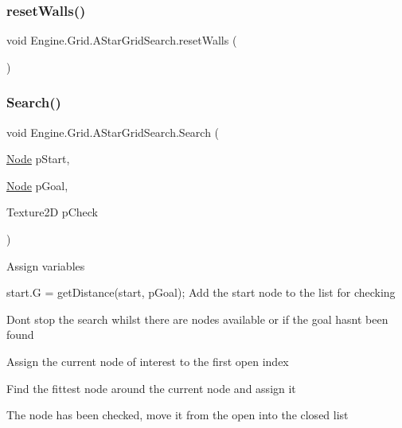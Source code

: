 \mbox{\label{a00398_a0e6a0e9cbcdaccff905216da631fad56}} 
\subsubsection{\texorpdfstring{reset\+Walls()}{resetWalls()}}
{\footnotesize\ttfamily void Engine.\+Grid.\+A\+Star\+Grid\+Search.\+reset\+Walls (\begin{DoxyParamCaption}{ }\end{DoxyParamCaption})\hspace{0.3cm}{\ttfamily [inline]}}

\mbox{\label{a00398_a9b15ad7367bb5421108a9232d4c4954c}} 
\subsubsection{\texorpdfstring{Search()}{Search()}}
{\footnotesize\ttfamily void Engine.\+Grid.\+A\+Star\+Grid\+Search.\+Search (\begin{DoxyParamCaption}\item[{\hyperlink{a00414}{Node}}]{p\+Start,  }\item[{\hyperlink{a00414}{Node}}]{p\+Goal,  }\item[{Texture2D}]{p\+Check }\end{DoxyParamCaption})\hspace{0.3cm}{\ttfamily [inline]}}

Assign variables

start.\+G = get\+Distance(start, p\+Goal); Add the start node to the list for checking

Dont stop the search whilst there are nodes available or if the goal hasnt been found

Assign the current node of interest to the first open index

Find the fittest node around the current node and assign it

The node has been checked, move it from the open into the closed list

